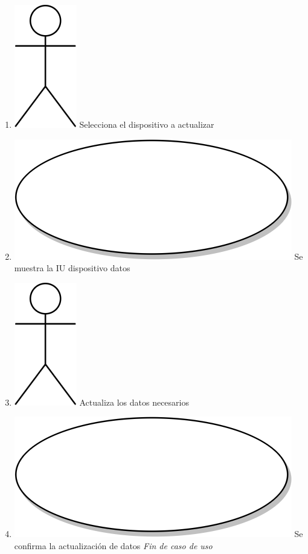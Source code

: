\begin{enumerate}
  \item {\includegraphics[scale=.1]{Capitulo3/img/actor.png} Selecciona el dispositivo a actualizar }
  \item {\includegraphics[scale=.05]{Capitulo3/img/proceso.png} Se muestra la IU dispositivo datos }
  \item {\includegraphics[scale=.1]{Capitulo3/img/actor.png} Actualiza los datos necesarios }
  \item {\includegraphics[scale=.05]{Capitulo3/img/proceso.png} Se confirma la actualización de datos }
  \textit{Fin de caso de uso} \\  
\end{enumerate}


